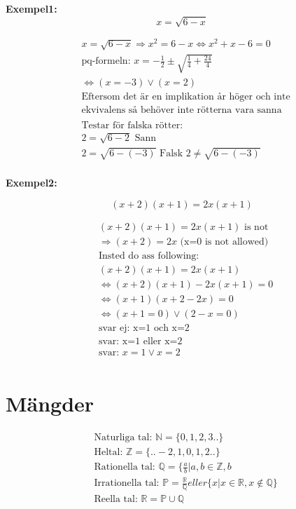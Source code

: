 \begin{multicols}{2}
\textbf{Exempel1:}
\begin{equation}
  x = \sqrt{6 - x}
\end{equation}

\begin{align*}
  &x = \sqrt{6 - x} \Rightarrow x^2 = 6 - x \Leftrightarrow x^2 + x - 6 = 0 \\
  &\text{pq-formeln: } x = -\frac{1}{2} \pm \sqrt{\frac{1}{4} + \frac{24}{4}} \\
  &\Leftrightarrow (x=-3) \lor (x=2) \\
  &\text{Eftersom det är en implikation år höger och inte} \\
  &\text{ekvivalens så behöver inte rötterna vara sanna } \\
  &\\
  &\text{Testar för falska rötter: } \\
  &2 = \sqrt{6-2} \text{ Sann} \\
  &2 = \sqrt{6-(-3)} \text{ Falsk } 2 \ne \sqrt{6-(-3)} \\
\end{align*}


\textbf{Exempel2:}\par
\begin{equation}
  (x+2)(x+1) = 2x(x+1)
\end{equation}

\begin{align*}
  &(x+2)(x+1) = 2x(x+1) \text{ is not } \\
  &\Rightarrow (x+2) = 2x \text{ (x=0 is not allowed)} \\
  &\text{Insted do ass following: } \\
  &(x+2)(x+1) = 2x(x+1) \\
  &\Leftrightarrow (x+2)(x+1) - 2x(x+1) = 0 \\
  &\Leftrightarrow (x+1)(x+2-2x) = 0 \\
  &\Leftrightarrow (x+1=0)\lor(2-x=0) \\
  &\text{svar ej: x=1 och x=2} \\
  &\text{svar: x=1 eller x=2} \\
  &\text{svar: } x=1 \lor x=2 \\
\end{align*}


\section{Mängder}
\begin{align*}
  &\text{Naturliga tal: } \mathbb{N} = \{0, 1, 2 , 3 ..  \} \\
  &\text{Heltal: }\mathbb{Z} = \{.. -2, 1, 0, 1, 2 ..  \} \\
  &\text{Rationella tal: }\mathbb{Q} = \{ \frac{a}{b} | a,b \in \mathbb{Z}, b \\
  &\text{Irrationella tal: }\mathbb{P} = \frac{\mathbb{R}}{\mathbb{Q}}eller \{ x | x \in \mathbb{R}, x \notin \mathbb{Q} \} \\
  &\text{Reella tal: }\mathbb{R} =  \mathbb{P} \cup \mathbb{Q} \\
\end{align*}


\end{multicols}

